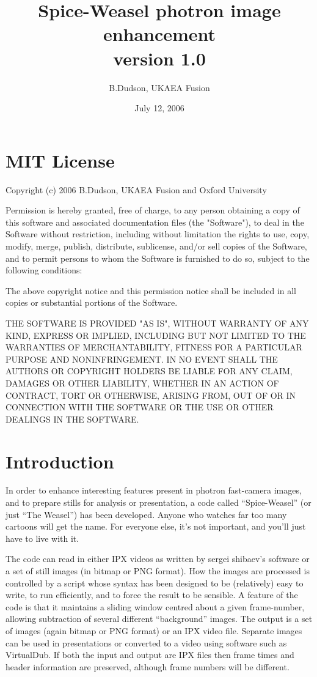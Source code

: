 \documentclass[12pt, a4paper]{article}
\begin{document}
\title{Spice-Weasel photron image enhancement\\version 1.0}
\author{B.Dudson, UKAEA Fusion}
\date{July 12, 2006}

\maketitle

\tableofcontents

\section{MIT License}
Copyright (c) 2006 B.Dudson, UKAEA Fusion and Oxford University

Permission is hereby granted, free of charge, to any person obtaining
a copy of this software and associated documentation files (the "Software"),
to deal in the Software without restriction, including without limitation
the rights to use, copy, modify, merge, publish, distribute, sublicense,
and/or sell copies of the Software, and to permit persons to whom the Software
is furnished to do so, subject to the following conditions:

The above copyright notice and this permission notice shall be included in all
copies or substantial portions of the Software.

THE SOFTWARE IS PROVIDED "AS IS", WITHOUT WARRANTY OF ANY KIND, EXPRESS OR IMPLIED,
INCLUDING BUT NOT LIMITED TO THE WARRANTIES OF MERCHANTABILITY, FITNESS FOR A
PARTICULAR PURPOSE AND NONINFRINGEMENT. IN NO EVENT SHALL THE AUTHORS OR COPYRIGHT
HOLDERS BE LIABLE FOR ANY CLAIM, DAMAGES OR OTHER LIABILITY, WHETHER IN AN ACTION
OF CONTRACT, TORT OR OTHERWISE, ARISING FROM, OUT OF OR IN CONNECTION WITH THE
SOFTWARE OR THE USE OR OTHER DEALINGS IN THE SOFTWARE.

\section{Introduction}
In order to enhance interesting features present in photron fast-camera images,
 and to prepare stills for analysis or presentation, a code called ``Spice-Weasel''
(or just ``The Weasel'') has been developed. Anyone who watches far too many cartoons
will get the name. For everyone else, it's not important, and you'll just have to live
with it.

The code can read in either IPX videos as written by sergei shibaev's software
or a set of still images (in bitmap or PNG format). 
How the images are processed is controlled by a script whose syntax has been
designed to be (relatively) easy to write, to run efficiently, and to force
the result to be sensible. A feature of
the code is that it maintains a sliding window centred about a given frame-number,
allowing subtraction of several different ``background'' images.
The output is a set of images (again bitmap or PNG format) or an IPX video file.
Separate images can be used in presentations or converted to a video using software
such as VirtualDub. If both the
input and output are IPX files then frame times and header information are preserved,
although frame numbers will be different.
\end{document}
